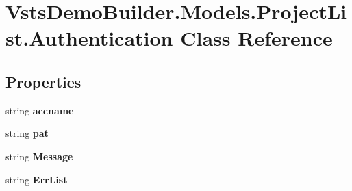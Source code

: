 \hypertarget{class_vsts_demo_builder_1_1_models_1_1_project_list_1_1_authentication}{}\section{Vsts\+Demo\+Builder.\+Models.\+Project\+List.\+Authentication Class Reference}
\label{class_vsts_demo_builder_1_1_models_1_1_project_list_1_1_authentication}
\subsection*{Properties}
\begin{DoxyCompactItemize}
\item 
\mbox{\label{class_vsts_demo_builder_1_1_models_1_1_project_list_1_1_authentication_aaa03e81ba8d39cf82640a42b700c10be}} 
string {\bfseries accname}
\item 
\mbox{\label{class_vsts_demo_builder_1_1_models_1_1_project_list_1_1_authentication_a010149b22480c055e08b96dd07d734e0}} 
string {\bfseries pat}
\item 
\mbox{\label{class_vsts_demo_builder_1_1_models_1_1_project_list_1_1_authentication_ae322b953630707537020cfdb09ce60b1}} 
string {\bfseries Message}
\item 
\mbox{\label{class_vsts_demo_builder_1_1_models_1_1_project_list_1_1_authentication_ac52b39875c02f785d4824fd7ccaa4ce3}} 
string {\bfseries Err\+List}
\item 
\mbox{\label{class_vsts_demo_builder_1_1_models_1_1_project_list_1_1_authentication_a3cfe694d8fbab0856c0e3df730635701}} 

\end{DoxyCompactItemize}
